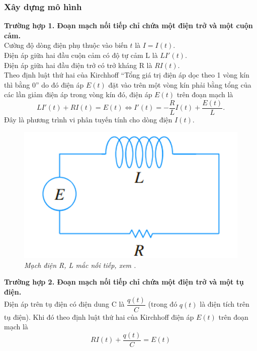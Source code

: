 \subsubsection{Xây dựng mô hình}
\noindent\textbf{Trường hợp 1.  Đoạn mạch nối tiếp chỉ chứa một điện trở và một cuộn cảm.}\\
Cường độ dòng điện phụ thuộc vào biến $t$ là $I=I(t)$.\\
Điện áp giữa hai đầu cuộn cảm có độ tự cảm L là $L{I}'(t)$. \\
Điện áp giữa hai đầu điện trở có trở kháng R là $RI(t)$. \\
Theo định luật thứ hai của Kirchhoff  “Tổng giá trị điện áp dọc theo 1 vòng kín thì bằng 0” do đó điện áp  $E(t)$ đặt vào trên một vòng kín phải bằng tổng của các lần giảm điện áp trong vòng kín đó, điện áp $E(t)$ trên đoạn mạch là  
\begin{equation}
	L{I}'(t)+RI(t)=E(t)\Leftrightarrow {I}'(t)=-\dfrac{R}{L}I(t)+\dfrac{E(t)}{L}.
	\label{eq:2.7}
\end{equation}
Đây là phương trình vi phân tuyến  tính cho dòng điện $I(t)$.
\begin{figure}[H]
	\centering
	\includegraphics[scale=0.6]{Images/hinh_2_15.png}
	\caption[Mạch điện R, L mắc nối tiếp, xem \cite{ref4}.
	]{\itshape\fontsize{13pt}{0pt}\selectfont\centering Mạch điện R, L mắc nối tiếp, xem \cite{ref4}.}
	\label{hinh2.15}
\end{figure}
\noindent\textbf{Trường hợp 2. Đoạn mạch nối tiếp chỉ chứa một điện trở và một tụ điện.}\\
Điện áp trên tụ điện có điện dung C là $\dfrac{q(t)}{C}$ (trong đó $q(t)$ là điện tích trên tụ điện).
Khi đó theo định luật thứ hai của Kirchhoff điện áp $E(t)$ trên đoạn mạch là
\begin{equation}
	RI(t)+\dfrac{q(t)}{C}=E(t)    
	\label{eq:2.8}
\end{equation}                                    
